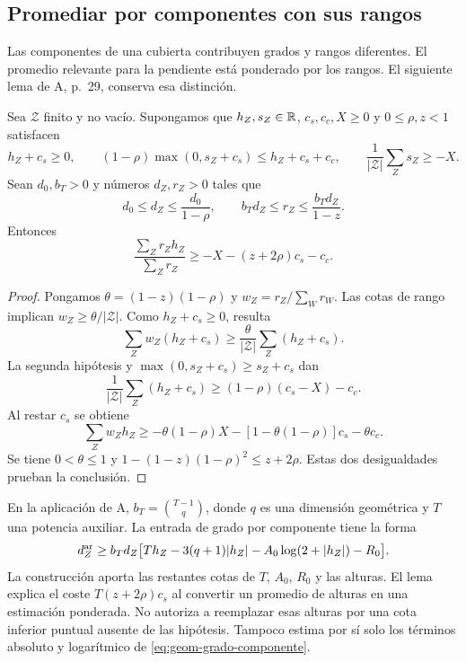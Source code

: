 \subsection{Promediar por componentes con sus rangos}

Las componentes de una cubierta contribuyen grados y rangos
diferentes. El promedio relevante para la pendiente está ponderado
por los rangos. El siguiente lema de A, p.~29, conserva esa
distinción.

\begin{lema}
Sea $\mathcal Z$ finito y no vacío. Supongamos que $h_Z,s_Z\in\mathbb{R}$,
$c_s,c_c,X\ge0$ y $0\le\rho,z<1$ satisfacen
\[
 h_Z+c_s\ge0,\qquad
 (1-\rho)\max(0,s_Z+c_s)\le h_Z+c_s+c_c,\qquad
 \frac1{|\mathcal Z|}\sum_Zs_Z\ge-X.
\]
Sean $d_0,b_T>0$ y números $d_Z,r_Z>0$ tales que
\[
 d_0\le d_Z\le\frac{d_0}{1-\rho},
 \qquad
 b_Td_Z\le r_Z\le\frac{b_Td_Z}{1-z}.
\]
Entonces
\begin{equation}
 \frac{\sum_Zr_Zh_Z}{\sum_Zr_Z}
       \ge-X-(z+2\rho)c_s-c_c.
 \label{eq:geom-promedio}
\end{equation}
\label{lem:geom-promedio}
\end{lema}

\begin{proof}
Pongamos $\theta=(1-z)(1-\rho)$ y
$w_Z=r_Z/\sum_Wr_W$.
Las cotas de rango implican $w_Z\ge\theta/|\mathcal Z|$.
Como $h_Z+c_s\ge0$, resulta
\[
 \sum_Zw_Z(h_Z+c_s)
 \ge\frac{\theta}{|\mathcal Z|}\sum_Z(h_Z+c_s).
\]
La segunda hipótesis y $\max(0,s_Z+c_s)\ge s_Z+c_s$ dan
\[
 \frac1{|\mathcal Z|}\sum_Z(h_Z+c_s)
       \ge(1-\rho)(c_s-X)-c_c.
\]
Al restar $c_s$ se obtiene
\[
 \sum_Zw_Zh_Z
 \ge-\theta(1-\rho)X
       -[1-\theta(1-\rho)]c_s-\theta c_c.
\]
Se tiene $0<\theta\le1$ y
$1-(1-z)(1-\rho)^2\le z+2\rho$.
Estas dos desigualdades prueban la conclusión.
\end{proof}

En la aplicación de A, $b_T=\binom{T-1}{q}$, donde $q$ es una
dimensión geométrica y $T$ una potencia auxiliar. La entrada
de grado por componente tiene la forma
\begin{equation}
 d_Z^{\rm ar}\ge b_Td_Z
 \bigl[Th_Z-3(q+1)|h_Z|-A_0\log(2+|h_Z|)-R_0\bigr].
 \label{eq:geom-grado-componente}
\end{equation}
La construcción aporta las restantes cotas de $T$, $A_0$, $R_0$
y las alturas. El lema explica el coste
$T(z+2\rho)c_s$ al convertir un promedio de alturas en una
estimación ponderada. No autoriza a reemplazar esas alturas
por una cota inferior puntual ausente de las hipótesis.
Tampoco estima por sí solo los términos absoluto y logarítmico
de \eqref{eq:geom-grado-componente}.

